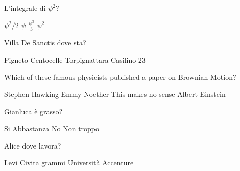 \documentclass{exam}
\begin{document}
\begin{center}
\end{center}
\vspace{5mm}
\vspace{5mm}
\vspace{5mm}
\begin{questions}
\question[10] L'integrale di $\psi^{2}$?
\begin{choices}
\choice $\psi^{2}/2$
\choice $\psi$
\choice $\frac{\psi^{3}}{3}$
\choice $\psi^{2}$
\end{choices}
\question[10] Villa De Sanctis dove sta?
\begin{choices}
\choice Pigneto
\choice Centocelle
\choice Torpignattara
\choice Casilino 23
\end{choices}
\question[10] Which of these famous physicists published a paper on Brownian Motion?
\begin{choices}
\choice Stephen Hawking 
\choice Emmy Noether
\choice This makes no sense
\choice Albert Einstein
\end{choices}
\question[10] Gianluca è grasso?
\begin{choices}
\choice Si
\choice Abbastanza
\choice No
\choice Non troppo
\end{choices}
\question[10] Alice dove lavora?
\begin{choices}
\choice Levi Civita
 grammi
\choice Università
\choice Accenture
\end{choices}
\end{questions}
           
\end{document}
